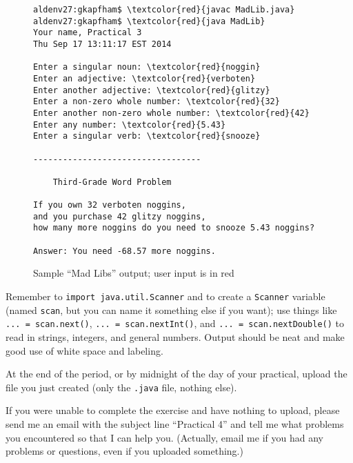 \begin{figure}[tb]
\begin{Verbatim}[commandchars=\\\{\}]
aldenv27:gkapfham$ \textcolor{red}{javac MadLib.java}
aldenv27:gkapfham$ \textcolor{red}{java MadLib}
Your name, Practical 3
Thu Sep 17 13:11:17 EST 2014

Enter a singular noun: \textcolor{red}{noggin}
Enter an adjective: \textcolor{red}{verboten}
Enter another adjective: \textcolor{red}{glitzy}
Enter a non-zero whole number: \textcolor{red}{32}
Enter another non-zero whole number: \textcolor{red}{42}
Enter any number: \textcolor{red}{5.43}
Enter a singular verb: \textcolor{red}{snooze}

----------------------------------

    Third-Grade Word Problem

If you own 32 verboten noggins,
and you purchase 42 glitzy noggins,
how many more noggins do you need to snooze 5.43 noggins?

Answer: You need -68.57 more noggins.
\end{Verbatim}
\caption{Sample ``Mad Libs'' output; user input is in red}
\label{mad}
\end{figure}

Remember to {\tt import java.util.Scanner} and to create a {\tt Scanner}
variable (named {\tt scan}, but you can name it something else if you want);
use things like \verb$... = scan.next()$, \verb$... = scan.nextInt()$, and
\verb$... = scan.nextDouble()$ to read in strings, integers, and general
numbers. Output should be neat and make good use of white space and
labeling.

At the end of the period, or by midnight of the day of your practical,
upload the file you just created (only the {\tt .java} file, nothing else).

If you were unable to complete the exercise and have nothing to upload,
please send me an email with the subject line ``Practical 4'' and
tell me what problems you encountered so that I can help you. (Actually,
email me if you had any problems or questions, even if you uploaded something.)



